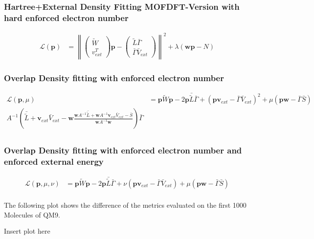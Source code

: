 \subsubsection{Hartree+External Density Fitting MOFDFT-Version with hard enforced electron number}
\begin{align}
    \mathcal{L}(\mathbf{p}) &= \left\lVert\left(\begin{array}{c}\tilde{W}\\v_{ext}^T\end{array}\right) \mathbf{p} - \left(\begin{array}{c}\tilde{L} \bar{\Gamma} \\ \bar{\Gamma}\bar{V}_{ext}\end{array}\right)\right\rVert^2 + \lambda (\mathbf{w}\mathbf{p}-N)
\end{align}



\subsubsection{Overlap Density fitting with enforced electron number}
\begin{align}
    \mathcal{L}(\mathbf{p},\mu) &= \mathbf{p} \tilde{W} \mathbf{p} - 2 \mathbf{p}\bar {\tilde L} \bar\Gamma + (\mathbf{p}\mathbf{v}_{ext}-\bar\Gamma \bar{V}_{ext})^2+\mu(\mathbf{p}\mathbf{w}-\bar\Gamma\bar S)\\
    A^{-1}\left(\bar {\tilde L} + \mathbf{v}_{ext} \bar{V}_{ext}- \mathbf{w}\frac{\mathbf{w}A^{-1}\bar {\tilde L} +\mathbf{w}A^{-1}\mathbf{v}_{ext} \bar{V}_{ext}-\bar S}{\mathbf{w}A^{-1}\mathbf{w}}\right)\bar\Gamma\\
\end{align}



\subsubsection{Overlap Density fitting with enforced electron number and enforced external energy}
\begin{align}
    \mathcal{L}(\mathbf{p},\mu,\nu) &= \mathbf{p} \tilde{W} \mathbf{p} - 2 \mathbf{p}\bar {\tilde L} \bar\Gamma + \nu(\mathbf{p}\mathbf{v}_{ext}-\bar\Gamma \bar{V}_{ext})+\mu(\mathbf{p}\mathbf{w}-\bar\Gamma\bar S)\\
\end{align}

The following plot shows the difference of the metrics evaluated on the first 1000 Molecules of QM9.

Insert plot here






